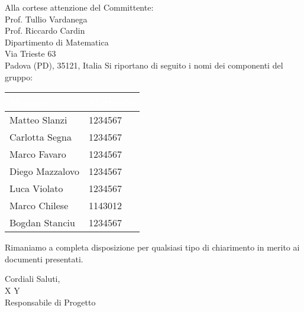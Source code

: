\documentclass[11pt, a4paper]{letter} %
\begin{document}
\begin{letter}{
	\-\\\-\\\-\\\-\\\-\\
	Alla cortese attenzione del Committente:	\\
	Prof. Tullio Vardanega\\
	Prof. Riccardo Cardin\\	
	Dipartimento di Matematica\\ 
	Via Trieste 63\\ 
	Padova (PD), 35121, Italia
}
Si riportano di seguito i nomi dei componenti del gruppo:
\begin{center}
\begin{longtable}[c]{|m{}|m{}|} 
\hline
\rowcolor{bluelogo}\textbf{\textcolor{white}{Membro}}  & \textbf{\textcolor{white}{Matricola}}\\
\hline
Matteo Slanzi & 1234567\\
\hline
\rowcolor{grigio}Carlotta Segna & 1234567\\
\hline
Marco Favaro & 1234567\\
\hline
\rowcolor{grigio}Diego Mazzalovo & 1234567\\
\hline
Luca Violato & 1234567\\
\hline
\rowcolor{grigio}Marco Chilese & 1143012\\
\hline
Bogdan Stanciu  & 1234567\\
\hline
\end{longtable}
\end{center}

Rimaniamo a completa disposizione per qualsiasi tipo di chiarimento in merito ai documenti presentati.

\closing{Cordiali Saluti,\\
X Y\\
Responsabile di Progetto}




\end{letter}
\end{document}
